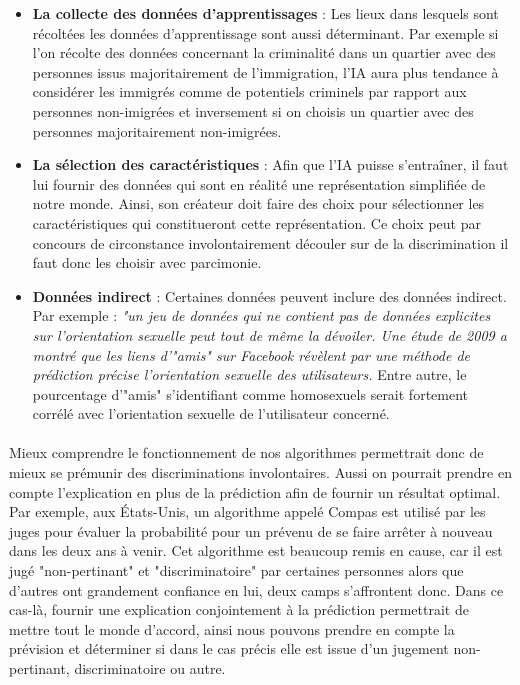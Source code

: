 \begin{itemize}
    \item \textbf{La collecte des données d'apprentissages} : Les lieux dans lesquels sont récoltées les données d'apprentissage sont aussi déterminant. Par exemple si l'on récolte des données concernant la criminalité dans un quartier avec des personnes issus majoritairement de l'immigration, l'IA aura plus tendance à considérer les immigrés comme de potentiels criminels par rapport aux personnes non-imigrées et inversement si on choisis un quartier avec des personnes majoritairement non-imigrées.
    \item \textbf{La sélection des caractéristiques} : Afin que l'IA puisse s'entraîner, il faut lui fournir des données qui sont en réalité une représentation simplifiée de notre monde. Ainsi, son créateur doit faire des choix pour sélectionner les caractéristiques qui constitueront cette représentation. Ce choix peut par concours de circonstance involontairement découler sur de la discrimination il faut donc les choisir avec parcimonie.
    \item \textbf{Données indirect} : Certaines données peuvent inclure des données indirect. Par exemple : \textit{"un jeu de données qui ne contient pas de données explicites sur l’orientation sexuelle peut tout de même la dévoiler. Une étude de 2009 a montré que les liens d’"amis" sur Facebook révèlent par une méthode de prédiction précise l’orientation sexuelle des utilisateurs.} Entre autre, le pourcentage d’"amis" s’identifiant comme homosexuels serait fortement corrélé avec l’orientation sexuelle de l’utilisateur concerné\cite{dicriminationAlgo}.
\end{itemize}
\paragraph{}Mieux comprendre le fonctionnement de nos algorithmes permettrait donc de mieux se prémunir des discriminations involontaires. Aussi on pourrait prendre en compte l'explication en plus de la prédiction afin de fournir un résultat optimal. Par exemple, aux États-Unis, un algorithme appelé Compas est utilisé par les juges pour évaluer la probabilité pour un prévenu de se faire arrêter à nouveau dans les deux ans à venir. Cet algorithme est beaucoup remis en cause, car il est jugé "non-pertinant" et "discriminatoire" par certaines personnes alors que d'autres ont grandement confiance en lui, deux camps s'affrontent donc. Dans ce cas-là, fournir une explication conjointement à la prédiction permettrait de mettre tout le monde d'accord, ainsi nous pouvons prendre en compte la prévision et déterminer si dans le cas précis elle est issue d'un jugement non-pertinant, discriminatoire ou autre.

